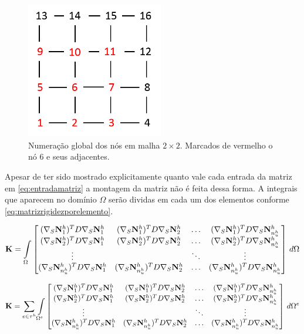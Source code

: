 \begin{figure}[!htbp]
\centering
\includegraphics[width=6cm]{chap01/figs/grid3x3ver.png}
\caption{Numeração global dos nós em malha $2\times2$. Marcados de vermelho o nó 6 e seus adjacentes.}
\label{fig:grid3x3ver}
\end{figure}


Apesar de ter sido mostrado explicitamente quanto vale cada entrada da matriz em \eqref{eq:entradamatriz} a montagem da matriz não é feita dessa forma. A integrais que aparecem no domínio $\Omega$ serão dividas em cada um dos elementos conforme \eqref{eq:matrizrigidezporelemento}. 

\begin{equation}
\mathbf{K}  = \omeint{
\begin{bmatrix}
\kij{1}{1} & \kij{1}{2}  & \hdots & \kij{1}{\freedomfine} \\ 
\kij{2}{1} & \kij{2}{2}  & \hdots & \kij{2}{\freedomfine} \\ 
\vdots &  & \ddots & \vdots\\ 
\kij{\freedomfine}{1} & \kij{\freedomfine}{2}  & \hdots & \kij{\freedomfine}{\freedomfine} 
\end{bmatrix}
}
\end{equation}

\begin{equation}\label{eq:matrizrigidezporelemento}
\mathbf{K}  = \sum_{e \in \tau^h} \omeeint{
\begin{bmatrix}
\kij{1}{1} & \kij{1}{2}  & \hdots & \kij{1}{\freedomfine} \\ 
\kij{2}{1} & \kij{2}{2}  & \hdots & \kij{2}{\freedomfine} \\ 
\vdots     &             & \ddots & \vdots\\ 
\kij{\freedomfine}{1} & \kij{\freedomfine}{2}  & \hdots & \kij{\freedomfine}{\freedomfine} 
\end{bmatrix}
}
\end{equation}


